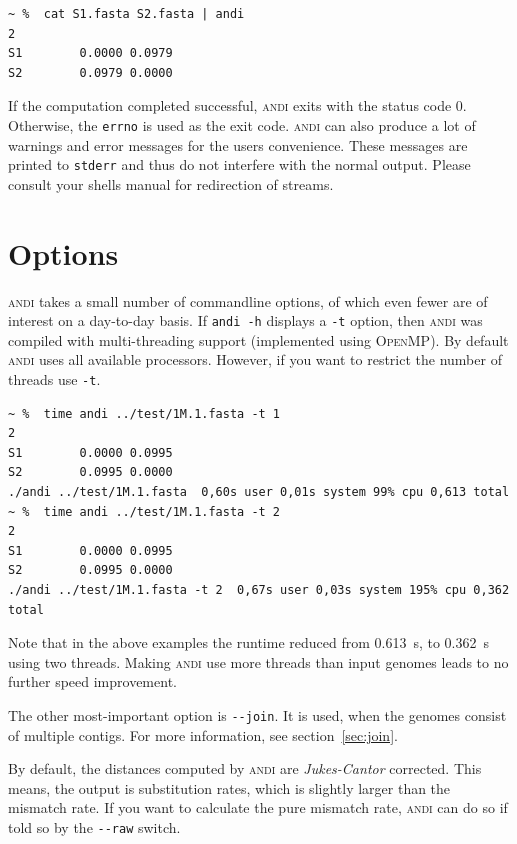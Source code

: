 \documentclass[a4paper,
  10pt,
  english,
  DIV=12,
  BCOR=8mm]{scrbook}
\newcommand{\algo}[1]{\textsc{{#1}}}
\newcommand{\andi}{\algo{andi} }
\begin{document}
\begin{lstlisting}
~ %  cat S1.fasta S2.fasta | andi
2
S1        0.0000 0.0979
S2        0.0979 0.0000
\end{lstlisting}

If the computation completed successful, \andi exits with the status code 0. Otherwise, the \lstinline$errno$ is used as the exit code. \andi can also produce a lot of warnings and error messages for the users convenience. These messages are printed to \lstinline$stderr$ and thus do not interfere with the normal output. Please consult your shells manual for redirection of streams.

\section{Options}

\andi takes a small number of commandline options, of which even fewer are of interest on a day-to-day basis. If \lstinline$andi -h$ displays a \lstinline$-t$ option, then \andi was compiled with multi-threading support (implemented using \algo{OpenMP}). By default \andi uses all available processors. However, if you want to restrict the number of threads use \lstinline$-t$.

\begin{lstlisting}
~ %  time andi ../test/1M.1.fasta -t 1
2
S1        0.0000 0.0995
S2        0.0995 0.0000
./andi ../test/1M.1.fasta  0,60s user 0,01s system 99% cpu 0,613 total
~ %  time andi ../test/1M.1.fasta -t 2
2
S1        0.0000 0.0995
S2        0.0995 0.0000
./andi ../test/1M.1.fasta -t 2  0,67s user 0,03s system 195% cpu 0,362 total
\end{lstlisting}

Note that in the above examples the runtime reduced from \SI{0.613}{\second}, to \SI{0.362}{\second} using two threads. Making \andi use more threads than input genomes leads to no further speed improvement.

The other most-important option is \lstinline$--join$. It is used, when the genomes consist of multiple contigs. For more information, see section~\ref{sec:join}.

By default, the distances computed by \andi are \emph{Jukes-Cantor} corrected. This means, the output is substitution rates, which is slightly larger than the mismatch rate. If you want to calculate the pure mismatch rate, \andi can do so if told so by the \lstinline$--raw$ switch.

\end{document}
